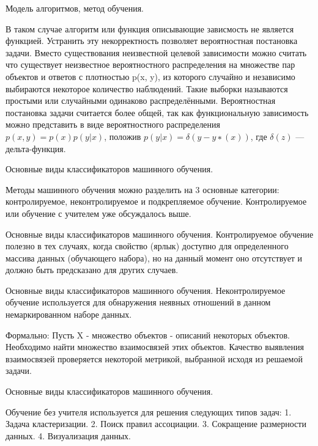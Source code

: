 \documentclass{beamer}
\begin{document}
\begin{frame}{Модель алгоритмов, метод обучения.}

В таком случае   алгоритм или функция описывающие зависмость  не является функцией.
Устранить эту некорректность позволяет вероятностная постановка задачи.
Вместо существования неизвестной целевой зависимости можно считать что 
существует  неизвестное вероятностного распределения на множестве пар объектов и ответов
с плотностью p(x, y), из которого случайно и независимо выбираются  некоторое количество  наблюдений. 
Такие выборки называются простыми или случайными одинаково распределёнными.
Вероятностная постановка задачи считается более общей, так как функциональную зависимость можно 
представить в виде вероятностного распределения $p(x, y) = p(x)p(y|x)$, положив $p(y|x) = δ(y − y ∗ (x))$, где $\delta(z)$ — дельта-функция.

\end{frame}  



\begin{frame}{Основные виды классификаторов машинного обучения.}

Методы машинного обучения можно разделить на 3 основные категории: контролируемое, 
неконтролируемое и подкрепляемое обучение. Контролируемое или обучение с учителем  уже обсуждалось выше.

\end{frame}


\begin{frame}{Основные виды классификаторов машинного обучения.}
Контролируемое обучение полезно в тех случаях, когда свойство (ярлык) доступно для определенного массива данных (обучающего набора), но на данный момент оно отсутствует и должно быть предсказано для других случаев. 
\end{frame}


\begin{frame}{Основные виды классификаторов машинного обучения.}
Неконтролируемое обучение используется для обнаружения неявных отношений в данном немаркированном наборе данных. 

Формально:
Пусть X - множество объектов  - описаний некоторых
объектов. Необходимо найти множество  взаимосвязей этих объектов.
Качество выявления взаимосвязей проверяется некоторой метрикой,
выбранной исходя из решаемой задачи.

\end{frame}


\begin{frame}{Основные виды классификаторов машинного обучения.}


Обучение без учителя используется для решения следующих
типов задач:
1. Задача кластеризации.
2. Поиск правил ассоциации.
3. Сокращение размерности данных.
4. Визуализация данных.

\end{frame}
\end{document}
